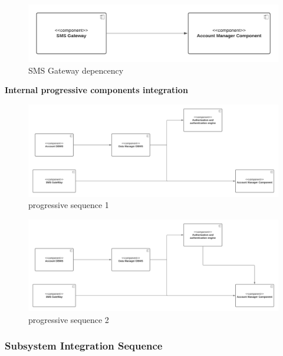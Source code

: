 \begin{itemize}
    \begin{figure}[h!]
        \centering
        \includegraphics[width=.8\textwidth]{Images/TestDiagram/Account/ExternalDependenciesSMS.png}
        \caption{\label{fig:AccountExternalDepSMS}{SMS Gateway depencency}}
    \end{figure}
    \FloatBarrier  
    \textbf{Internal progressive components integration}
    \begin{figure}[h!]
        \centering
        \includegraphics[width=1\textwidth]{Images/TestDiagram/Account/subAccount1.png}
        \caption{\label{fig:progressiveAccount1}{progressive sequence 1}}
    \end{figure}
    \FloatBarrier 
    \begin{figure}[h!]
        \centering
        \includegraphics[width=1\textwidth]{Images/TestDiagram/Account/subAccount2.png}
        \caption{\label{fig:progressiveAccount1}{progressive sequence 2}}
    \end{figure}
    \FloatBarrier 

\end{itemize}


\subsubsection{Subsystem Integration Sequence}
\label{subsect: subsytemintegrationsequence}

